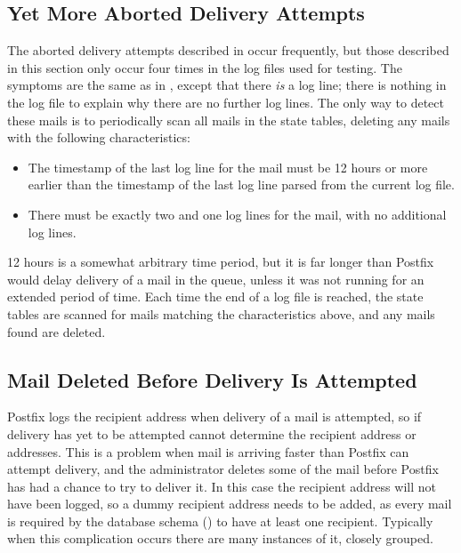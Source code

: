 \subsection{Yet More Aborted Delivery Attempts}

\label{yet more aborted delivery attempts}

The aborted delivery attempts described in  occur frequently, but those described in this section only occur
four times in the \numberOFlogFILES{} log files used for testing.  The
symptoms are the same as in , except
that there \textit{is\/} a  log line; there is nothing in
the log file to explain why there are no further log lines.  The only way
to detect these mails is to periodically scan all mails in the state
tables, deleting any mails with the following characteristics:

\begin{itemize}

    \item The timestamp of the last log line for the mail must be 12 hours
        or more earlier than the timestamp of the last log line parsed from
        the current log file.

    \item There must be exactly two  and one 
        log lines for the mail, with no additional log lines.

\end{itemize}

12 hours is a somewhat arbitrary time period, but it is far longer than
Postfix would delay delivery of a mail in the queue, unless it was not
running for an extended period of time.  Each time the end of a log file is
reached, the state tables are scanned for mails matching the
characteristics above, and any mails found are deleted.

\subsection{Mail Deleted Before Delivery Is Attempted}

\label{Mail deleted before delivery is attempted}

Postfix logs the recipient address when delivery of a mail is attempted, so
if delivery has yet to be attempted \parsername{} cannot determine the
recipient address or addresses.  This is a problem when mail is arriving
faster than Postfix can attempt delivery, and the administrator deletes
some of the mail before Postfix has had a chance to try to deliver it.  In
this case the recipient address will not have been logged, so a dummy
recipient address needs to be added, as every mail is required by the
database schema () to have at least one
recipient.  Typically when this complication occurs there are many
instances of it, closely grouped.

